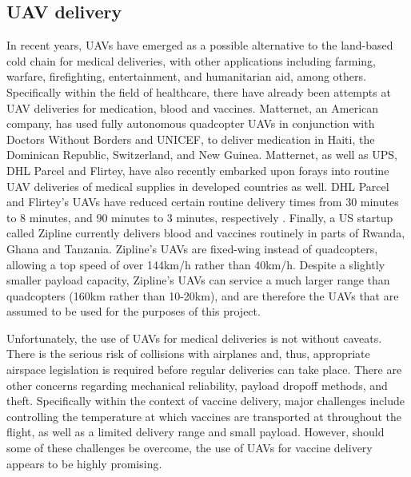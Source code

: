 \subsection{UAV delivery}
In recent years, UAVs have emerged as a possible alternative to the land-based cold chain for medical deliveries, with other applications including farming, warfare, firefighting, entertainment, and humanitarian aid, among others.
Specifically within the field of healthcare, there have already been attempts at UAV deliveries for medication, blood and vaccines.
Matternet, an American company, has used fully autonomous quadcopter UAVs in conjunction with Doctors Without Borders and UNICEF, to deliver medication in Haiti, the Dominican Republic, Switzerland, and New Guinea. Matternet, as well as UPS, DHL Parcel and Flirtey, have also recently embarked upon forays into routine UAV deliveries of medical supplies in developed countries as well. DHL Parcel and Flirtey's UAVs have reduced certain routine delivery times from 30 minutes to 8 minutes, and 90 minutes to 3 minutes, respectively \cite{scott2017drone}.
Finally, a US startup called Zipline currently delivers blood and vaccines routinely in parts of Rwanda, Ghana and Tanzania. Zipline's UAVs are fixed-wing instead of quadcopters, allowing a top speed of over 144km/h rather than 40km/h. Despite a slightly smaller payload capacity, Zipline's UAVs can service a much larger range than quadcopters (160km rather than 10-20km), and are therefore the UAVs that are assumed to be used for the purposes of this project.

Unfortunately, the use of UAVs for medical deliveries is not without caveats. There is the serious risk of collisions with airplanes and, thus, appropriate airspace legislation is required before regular deliveries can take place. There are other concerns regarding mechanical reliability, payload dropoff methods, and theft. Specifically within the context of vaccine delivery, major challenges include controlling the temperature at which vaccines are transported at throughout the flight, as well as a limited delivery range and small payload. However, should some of these challenges be overcome, the use of UAVs for vaccine delivery appears to be highly promising.


